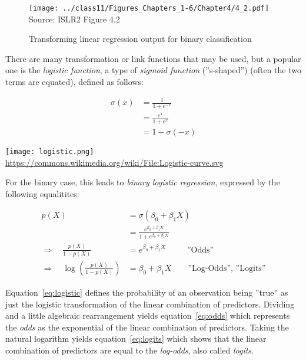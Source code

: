 \begin{figure}
\centering
\texttt{[image: ../class11/Figures\_Chapters\_1-6/Chapter4/4\_2.pdf]}
\scriptsize Source: ISLR2 Figure 4.2

\caption{Transforming linear regression output for binary classification}
\label{fig:classification1}
\end{figure}

There are many transformation or link functions that may be used, but a popular one is the \emph{logistic function}, a type of \emph{sigmoid function} (''s-shaped'') (often the two terms are equated), defined as follows:

\begin{minipage}{.4\textwidth}
\begin{align*}
  \sigma(x) &= \frac{1}{1 + e^{-x}} \\
  &= \frac{e^x}{1 + e^x} \\
  &= 1 - \sigma(-x)
\end{align*}
\end{minipage}
\begin{minipage}{.6\textwidth}
\centering
\texttt{[image: logistic.png]} \\

\tiny \url{https://commons.wikimedia.org/wiki/File:Logistic-curve.svg} \normalsize
\end{minipage}

For the binary case, this leads to \emph{binary logistic regression}, expressed by the following equalitites:

\begin{align}
p(X) &= \sigma( \beta_0 + \beta_1 X) \nonumber \\ 
     &= \frac{e^{\beta_0 + \beta_1 X}}{1 + e^{\beta_0 + \beta_1 X}} \label{eq:logistic} \\
\Rightarrow \quad \frac{p(X)}{1 - p(X)} &= e^{\beta_0 + \beta_1 X} \qquad\;\; \text{''Odds''} \label{eq:odds} \\
\Rightarrow \quad \log \left( \frac{p(X)}{1 - p(X)} \right) &= \beta_0 + \beta_1 X \qquad \text{''Log-Odds'', ''Logits''} \label{eq:logits}
\end{align}

Equation~\ref{eq:logistic} defines the probability of an observation being ''true'' as just the logistic transformation of the linear combination of predictors. Dividing and a little algebraic rearrangement yields equation~\ref{eq:odds} which represents the \emph{odds} as the exponential of the linear combination of predictors. Taking the natural logarithm yields equation~\ref{eq:logits} which shows that the linear combination of predictors are equal to the \emph{log-odds}, also called \emph{logits}.

